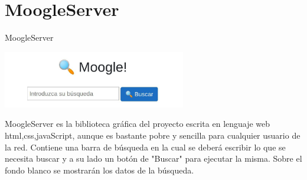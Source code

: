 \section{MoogleServer}
\begin{frame}[fragile]{MoogleServer}
\begin{center}
  \includegraphics[width=8cm]{moogle.jpg}
\end{center}

MoogleServer es la biblioteca gr\'afica del proyecto escrita en lenguaje web html,css,javaScript, aunque 
es bastante pobre y sencilla para cualquier usuario de la red. Contiene una barra de b\'usqueda en la cual
se deber\'a escribir lo que se necesita buscar y a su lado un bot\'on de "Buscar" para ejecutar la misma.
Sobre el fondo blanco se mostrar\'an los datos de la b\'usqueda.

\end{frame}